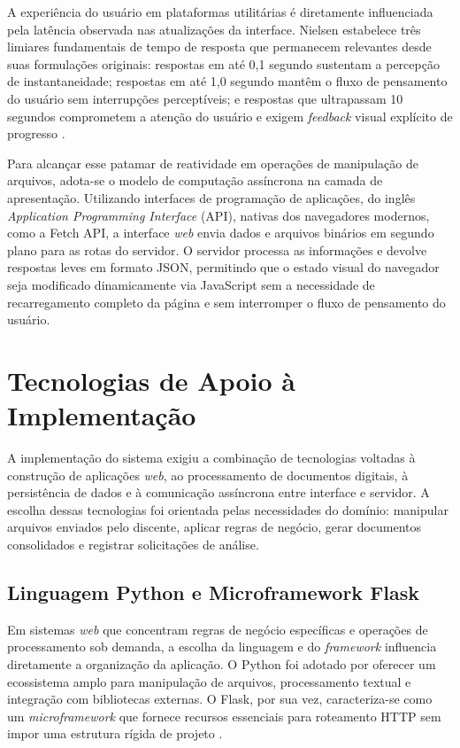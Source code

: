 A experiência do usuário em plataformas utilitárias é diretamente influenciada pela latência observada nas atualizações da interface. Nielsen estabelece três limiares fundamentais de tempo de resposta que permanecem 
relevantes desde suas formulações originais: respostas em até 0,1 segundo sustentam a percepção de instantaneidade; respostas em até 1,0 segundo mantêm o fluxo de pensamento do usuário sem interrupções perceptíveis; e respostas que ultrapassam 10 segundos comprometem a atenção do usuário e exigem \textit{feedback} visual explícito de progresso \cite{nielsen1993}.

Para alcançar esse patamar de reatividade em operações de manipulação de arquivos, adota-se o modelo de computação assíncrona na camada de apresentação. Utilizando interfaces de programação de aplicações, do inglês \textit{Application Programming Interface} (API), nativas dos navegadores modernos, como a Fetch API, a interface \textit{web} envia dados e arquivos binários em segundo plano para as rotas do servidor. O servidor processa as informações e devolve respostas leves em formato JSON, permitindo que o estado visual do navegador seja modificado dinamicamente via JavaScript sem a necessidade de recarregamento completo da página e sem interromper o fluxo de pensamento do usuário.

\section{Tecnologias de Apoio à Implementação}
\label{sec:tecnologias_ferramentas}

A implementação do sistema exigiu a combinação de tecnologias voltadas à construção de aplicações \textit{web}, ao processamento de documentos digitais, à persistência de dados e à comunicação assíncrona entre interface e servidor. A escolha dessas tecnologias foi orientada pelas necessidades do domínio: manipular arquivos enviados pelo discente, aplicar regras de negócio, gerar documentos consolidados e registrar solicitações de análise.

\subsection{Linguagem Python e Microframework Flask}

Em sistemas \textit{web} que concentram regras de negócio específicas e operações de processamento sob demanda, a escolha da linguagem e do \textit{framework} influencia diretamente a organização da aplicação. O Python foi adotado por oferecer um ecossistema amplo para manipulação de arquivos, processamento textual e integração com bibliotecas externas. O Flask, por sua vez, caracteriza-se como um \textit{microframework} que fornece recursos essenciais para roteamento HTTP sem impor uma estrutura rígida de projeto \cite{grinberg2018}.

